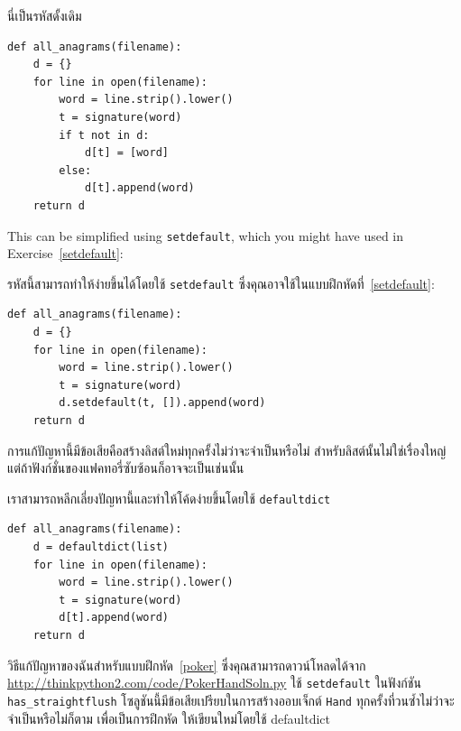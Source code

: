 นี่เป็นรหัสดั้งเดิม

\begin{verbatim}
def all_anagrams(filename):
    d = {}
    for line in open(filename):
        word = line.strip().lower()
        t = signature(word)
        if t not in d:
            d[t] = [word]
        else:
            d[t].append(word)
    return d
\end{verbatim}

This can be simplified using {\tt setdefault}, which you might
have used in Exercise~\ref{setdefault}:

รหัสนี้สามารถทำให้ง่ายขึ้นได้โดยใช้ {\tt setdefault} ซึ่งคุณอาจใช้ในแบบฝึกหัดที่~\ref{setdefault}:

\begin{verbatim}
def all_anagrams(filename):
    d = {}
    for line in open(filename):
        word = line.strip().lower()
        t = signature(word)
        d.setdefault(t, []).append(word)
    return d
\end{verbatim}

การแก้ปัญหานี้มีข้อเสียคือสร้างลิสต์ใหม่ทุกครั้งไม่ว่าจะจำเป็นหรือไม่ สำหรับลิสต์นั้นไม่ใช่เรื่องใหญ่ แต่ถ้าฟังก์ชั่นของแฟคทอรี่ซับซ้อนก็อาจจะเป็นเช่นนั้น


เราสามารถหลีกเลี่ยงปัญหานี้และทำให้โค้ดง่ายขึ้นโดยใช้ {\tt defaultdict}

\begin{verbatim}
def all_anagrams(filename):
    d = defaultdict(list)
    for line in open(filename):
        word = line.strip().lower()
        t = signature(word)
        d[t].append(word)
    return d
\end{verbatim}


วิธีแก้ปัญหาของฉันสำหรับแบบฝึกหัด~\ref{poker} ซึ่งคุณสามารถดาวน์โหลดได้จาก \url{http://thinkpython2.com/code/PokerHandSoln.py} 
ใช้ {\tt setdefault} ในฟังก์ชัน \verb"has_straightflush" โซลูชันนี้มีข้อเสียเปรียบในการสร้างออบเจ็กต์ {\tt Hand} 
ทุกครั้งที่วนซ้ำไม่ว่าจะจำเป็นหรือไม่ก็ตาม เพื่อเป็นการฝึกหัด ให้เขียนใหม่โดยใช้ defaultdict


